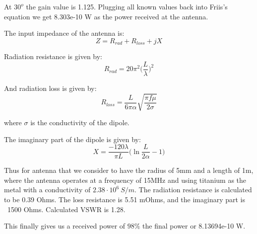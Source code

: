 \documentclass[12pt]{article}
\begin{document}
\begin{center}
\end{center}

At $30^o$ the gain value is 1.125. Plugging all known values back into Friis's equation we get 8.303e-10 W as the power received at the antenna.



The input impedance of the antenna is:
$$
Z = R_{rad} + R_{loss} +jX
$$ 

Radiation resistance is given by:
$$
R_{rad} = 20\pi^2 \Big( \frac{L}{\lambda} \Big)^2
$$

And radiation loss is given by:
$$
R_{loss} = \frac{L}{6\pi\alpha}\sqrt{\frac{\pi f \mu}{2 \sigma}}
$$

where $\sigma$ is the conductivity of the dipole.

The imaginary part of the dipole is given by:
$$
X = \frac{-120\lambda}{\pi L} \Big( \ln \frac{L}{2 \alpha} - 1 \Big)
$$

Thus for antenna that we consider to have the radius of 5mm and a length of 1m, where the antenna operates at a frequency of 15MHz and using titanium as the metal with a conductivity of $2.38 \cdot 10^6\:S/m$. The radiation resistance is calculated to be 0.39 Ohms. The loss resistance is 5.51 mOhms, and the imaginary part is ~1500 Ohms. Calculated VSWR is 1.28.

This finally gives us a received power of $98 \%$ the final power or 8.13694e-10 W.

\newpage
\end{document}
